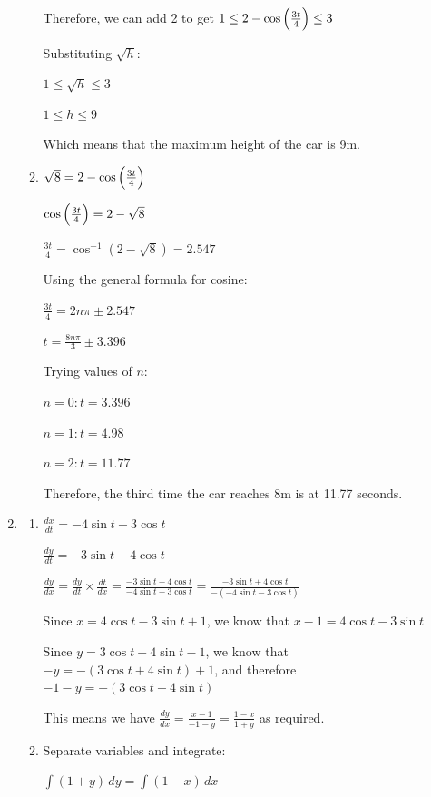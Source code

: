 \documentclass[../main.tex]{subfiles}
\begin{document}
\begin{spacing}{1.5}
\begin{enumerate}[itemsep=0.7cm]
\begin{enumerate}[itemsep=0.5cm]
        Therefore, we can add 2 to get $1 \leq 2-\cos{\Bigl(\frac{3t}{4}\Bigr)}\leq 3$

        Substituting $\sqrt{h}$:

        $1 \leq \sqrt{h} \leq 3$

        $1 \leq h \leq 9$

        Which means that the maximum height of the car is 9m.

        \item 
        $\sqrt{8}=2-\cos{\Bigl(\frac{3t}{4}\Bigr)}$

        $\cos{\Bigl(\frac{3t}{4}\Bigr)}=2-\sqrt{8}$

        $\frac{3t}{4}=\cos^{-1}(2-\sqrt{8})=2.547$

        Using the general formula for cosine:

        $\frac{3t}{4}=2n\pi \pm 2.547$

        $t=\frac{8n\pi}{3}\pm 3.396$

        Trying values of $n$:

        $n=0 : t=3.396$

        $n=1 : t=4.98$

        $n=2 : t=11.77$

        Therefore, the third time the car reaches 8m is at 11.77 seconds.

    \end{enumerate}

    \item 
    \begin{enumerate}[itemsep=0.7cm]
        \item 
        $\frac{dx}{dt}=-4\sin{t}-3\cos{t}$

        $\frac{dy}{dt}=-3\sin{t}+4\cos{t}$

        $\frac{dy}{dx}=\frac{dy}{dt}\times \frac{dt}{dx}=\frac{-3\sin{t}+4\cos{t}}{-4\sin{t}-3\cos{t}}=\frac{-3\sin{t}+4\cos{t}}{-(-4\sin{t}-3\cos{t})}$

        Since $x=4\cos{t}-3\sin{t}+1$, we know that $x-1=4\cos{t}-3\sin{t}$

        Since $y=3\cos{t}+4\sin{t}-1$, we know that $-y=-(3\cos{t}+4\sin{t})+1$, and therefore $-1-y=-(3\cos{t}+4\sin{t})$

        This means we have $\frac{dy}{dx}=\frac{x-1}{-1-y}=\frac{1-x}{1+y}$ as required.

        \item 
        Separate variables and integrate:

        $\int (1+y)\,dy=\int (1-x)\,dx$


\end{enumerate}
\end{enumerate}
\end{spacing}
\end{document}

